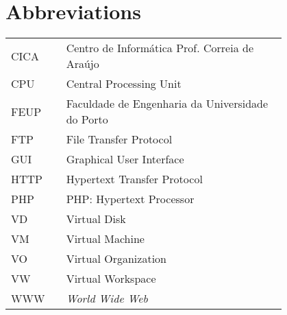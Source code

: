 \chapter*{Abbreviations}

\begin{flushleft}
\begin{tabular}{l p{0.8\linewidth}}
CICA	 & Centro de Informática Prof. Correia de Araújo\\
CPU	 & Central Processing Unit\\
FEUP	 & Faculdade de Engenharia da Universidade do Porto\\
FTP	 & File Transfer Protocol\\
GUI	 & Graphical User Interface\\
HTTP	 & Hypertext Transfer Protocol\\
PHP	 & PHP: Hypertext Processor\\
VD	 & Virtual Disk\\
VM	 & Virtual Machine\\
VO	 & Virtual Organization\\
VW	 & Virtual Workspace\\
WWW      & \emph{World Wide Web}
\end{tabular}
\end{flushleft}

